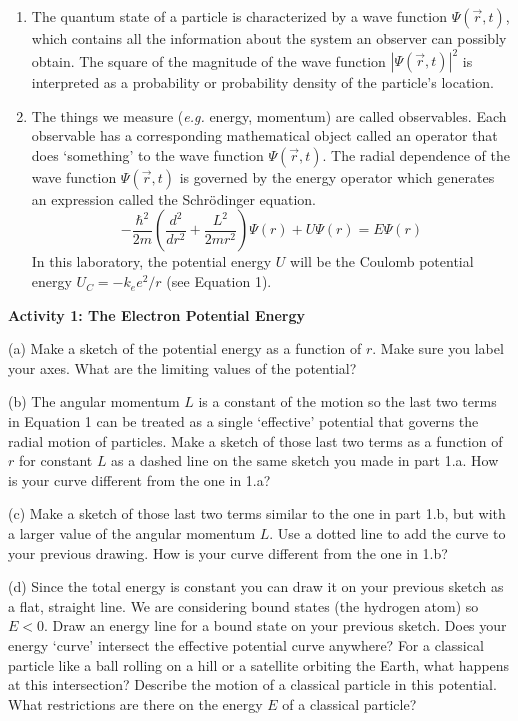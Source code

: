 \begin{enumerate}

\item The quantum state of a particle is characterized by a wave function  
$\Psi(\vec r,t)$, which contains all the information about the system an observer can 
possibly obtain.
The square of the magnitude of the wave function $|\Psi (\vec r,t)|^2$ 
is interpreted as a probability or probability density of the particle's location. 

\item The things we measure ({\it e.g.} energy, momentum) are called observables. 
Each observable has a corresponding mathematical object called an operator 
that does `something' to the wave function $\Psi(\vec r,t)$.
The radial dependence of the wave function $\Psi(\vec r,t)$ is governed by
the energy operator which generates an expression called the
Schr\"odinger equation.
\begin{equation}
-\frac{\hbar^2}{2 m}\left ( \frac{d^2}{d r^2} +  
   \frac{L^2}{2 m r^2} \right ) \Psi(r) + U \Psi(r) = E  \Psi(r)
\end{equation}\label{eq:probdens2}
\noindent In this laboratory, the potential energy $U$ will be the Coulomb potential energy $U_C = -k_e e^2/r$
(see Equation 1).

\end{enumerate}

\textbf{Activity 1: The Electron Potential Energy}

(a) Make a sketch of the potential energy as a function of $r$.
Make sure you label your axes.
What are the limiting values of the potential?
\vskip 4.0cm

\newpage

(b) The angular momentum $L$ is a constant of the motion so the last two terms in 
Equation 1 can be treated as a single `effective' potential 
that governs the radial motion of particles.
Make a sketch of those last two terms as a function of $r$ for constant $L$
as a dashed line on the same sketch you made in part 1.a.
How is your curve different from the one in 1.a?
\vskip 2.0cm


(c) Make a sketch of those last two terms similar to the one in part 1.b, but with a larger
value of the angular momentum $L$.
Use a dotted line to add the curve to your previous drawing.
How is your curve different from the one in 1.b?
\vskip 2.0cm


(d) Since the total energy is constant you can draw it on your previous sketch as a flat, straight
line. We are considering bound states (the hydrogen atom) so $E < 0$.
Draw an energy line for a bound state on your previous sketch.
Does your energy `curve' intersect the effective potential curve anywhere?
For a classical particle like a ball rolling on a hill or a satellite orbiting the
Earth,
what happens at this intersection?
Describe the motion of a classical particle in this potential.
What restrictions are there on the energy $E$ of a classical particle?
\vskip 3.0cm


